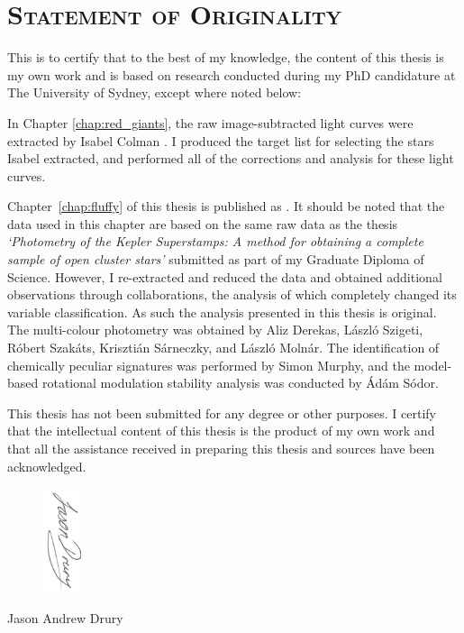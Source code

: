 \chapter*{\textsc{Statement of Originality}}
\vspace{-0.5cm}

This is to certify that to the best of my knowledge, the content of this thesis is my own work and is based on research conducted during my PhD candidature at The University of Sydney, except where noted below:

\vspace{0.5cm}

In Chapter \ref{chap:red_giants}, the raw image-subtracted light curves were extracted by Isabel Colman \citep{colman_pixels_2020}. I produced the target list for selecting the stars Isabel extracted, and performed all of the corrections and analysis for these light curves.

\vspace{0.5cm}

Chapter~\ref{chap:fluffy} of this thesis is published as \cite{drury_large_2017}. 
It should be noted that the data used in this chapter are based on the same raw data as the thesis {\it `Photometry of the Kepler Superstamps: A method for obtaining a complete sample of open cluster stars'} submitted as part of my Graduate Diploma of Science. However, I re-extracted and reduced the data and obtained additional observations through collaborations, the analysis of which completely changed its variable classification. As such the analysis presented in this thesis is original. The multi-colour photometry was obtained by Aliz Derekas, L\'aszl\'o Szigeti, R\'obert Szak\'ats, Kriszti\'an S\'arneczky, and L\'aszl\'o Moln\'ar. The identification of chemically peculiar signatures was performed by Simon Murphy, and the model-based rotational modulation stability analysis was conducted by \'Ad\'am S\'odor.

\vspace{0.5cm}

This thesis has not been submitted for any degree or other purposes. I certify that the intellectual content of this thesis is the product of my own work and that all the assistance received in preparing this thesis and sources have been acknowledged.

\vspace{1cm}

\begin{figure}[!h]
\centering
\includegraphics[width=0.1\textwidth,angle=90]{Chapter_Preface/signature.png}
\end{figure}
\begin{center}
Jason Andrew Drury
\end{center}
